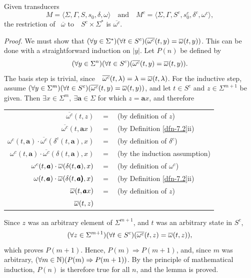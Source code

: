 \begin{lmm}\label{lmm-7.2}
Given transducers
\[ M=\langle\Sigma,\Gamma,S,s_0,\delta,\omega\rangle\quad\text{and}\quad M^c =
\langle\Sigma,\Gamma,S^c,s^c_0,\delta^c,\omega^c\rangle, \]
the restriction of \  $\overline\omega$ to\ \ $S^c \times \Sigma^*$ is $\overline{\omega^c}$.

\emph{Proof.} We must show that $(\forall y \in \Sigma^*)(\forall t \in S^c)
(\overline{\omega^c}(t,y)=\overline{\omega}(t,y))$. This can be done with a straightforward induction on
$|y|$. Let $P(n)$ be defined by
\[ (\forall y \in \Sigma^n)(\forall t \in S^c)(\overline{\omega^c}(t,y) = \overline{\omega}(t,y)). \]
The basis step is trivial, since\ \ $\overline{\omega^c}(t,\lambda)=\lambda=\overline{\omega}(t,\lambda)$.
For the inductive step, assume
$(\forall y \in \Sigma^m)(\forall t \in S^c)(\overline{\omega^c}(t,y)=\overline{\omega}(t,y))$, and let
$t \in S^c$ and $z \in \Sigma^{m+1}$ be given. Then $\exists x \in \Sigma^m,\
\exists\pmb{a} \in \Sigma$ for which $z = \pmb{a}x$, and therefore
\begin{center}\begin{tabular}{rcl}
$\overline{\omega^c}(t,z)$ & $=$ & (by definition of $z$) \\
$\overline{\omega^c}(t,\pmb{a}x)$ & $=$ & (by Definition \ref{dfn-7.2}ii) \\
$\omega^c(t,\pmb{a})\cdot\overline{\omega^c}(\delta^c(t,\pmb{a}),x)$ & $=$ &
	(by definition of $\delta^c$) \\
$\omega^c(t,\pmb{a})\cdot\overline{\omega^c}(\delta(t,\pmb{a}),x)$ & $=$ &
	(by the induction assumption) \\
$\omega^c(t,\pmb{a})\cdot\overline{\omega}(\delta(t,\pmb{a}),x)$ & $=$ &
	(by definition of $\omega^c$) \\
$\omega(t,\pmb{a})\cdot\overline{\omega}(\delta(t,\pmb{a)},x)$ & $=$ &
	(by Definition \ref{dfn-7.2}ii) \\
$\overline{\omega}(t,\pmb{a}x)$ & $=$ & (by definition of $z$) \\
$\overline{\omega}(t,z)$ &&
\end{tabular}\end{center}
Since $z$ was an arbitrary element of $\Sigma^{m+1}$, and $t$ was an arbitrary
state in $S^c$,
\[ (\forall z \in \Sigma^{m+1})(\forall t \in S^c)(\overline{\omega^c}(t,z)=\overline{\omega}(t,z)), \]
which proves $P(m+1)$. Hence, $P(m) \Rightarrow P(m+1)$, and, since $m$ was
arbitrary, $(\forall m \in \mathbb{N})(P(m) \Rightarrow P(m+1))$. By the principle of
mathematical induction, $P(n)$ is therefore true for all $n$, and the lemma is
proved.
\end{lmm}

